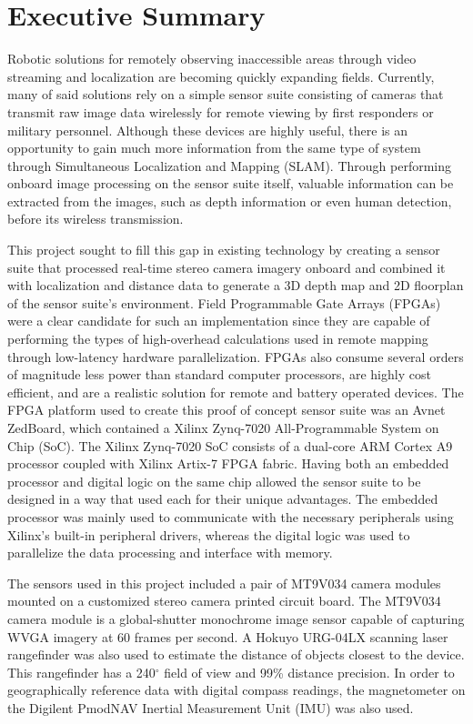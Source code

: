 {}
\section*{Executive Summary}
Robotic solutions for remotely observing inaccessible areas through video streaming and localization are becoming quickly expanding fields. Currently, many of said solutions rely on a simple sensor suite consisting of cameras that transmit raw image data wirelessly for remote viewing by first responders or military personnel. Although these devices are highly useful, there is an opportunity to gain much more information from the same type of system through Simultaneous Localization and Mapping (SLAM). Through performing onboard image processing on the sensor suite itself, valuable information can be extracted from the images, such as depth information or even human detection, before its wireless transmission.
\par
This project sought to fill this gap in existing technology by creating a sensor suite that processed real-time stereo camera imagery onboard and combined it with localization and distance data to generate a 3D depth map and 2D floorplan of the sensor suite's environment. Field Programmable Gate Arrays (FPGAs) were a clear candidate for such an implementation since they are capable of performing the types of high-overhead calculations used in remote mapping through low-latency hardware parallelization. FPGAs also consume several orders of magnitude less power than standard computer processors, are highly cost efficient, and are a realistic solution for remote and battery operated devices. The FPGA platform used to create this proof of concept sensor suite was an Avnet ZedBoard, which contained a Xilinx Zynq-7020 All-Programmable System on Chip (SoC). The Xilinx Zynq-7020 SoC consists of a dual-core ARM Cortex A9 processor coupled with Xilinx Artix-7 FPGA fabric. Having both an embedded processor and digital logic on the same chip allowed the sensor suite to be designed in a way that used each for their unique advantages. The embedded processor was mainly used to communicate with the necessary peripherals using Xilinx's built-in peripheral drivers, whereas the digital logic was used to parallelize the data processing and interface with memory.
\par
The sensors used in this project included a pair of MT9V034 camera modules mounted on a customized stereo camera printed circuit board. The MT9V034 camera module is a global-shutter monochrome image sensor capable of capturing WVGA imagery at 60 frames per second. A Hokuyo URG-04LX scanning laser rangefinder was also used to estimate the distance of objects closest to the device. This rangefinder has a 240$^\circ$ field of view and 99\% distance precision. In order to geographically reference data with digital compass readings, the magnetometer on the Digilent PmodNAV Inertial Measurement Unit (IMU) was also used. 
